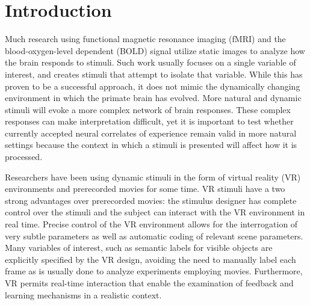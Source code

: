 \documentclass[review,1p,authoryear]{elsarticle}
\begin{document}
\section{Introduction}
Much research using functional magnetic resonance imaging (fMRI) and the blood-oxygen-level dependent (BOLD) signal utilize static images to analyze how the brain responds to stimuli.
Such work usually focuses on a single variable of interest, and creates stimuli that attempt to isolate that variable.
While this has proven to be a successful approach, it does not mimic the dynamically changing environment in which the primate brain has evolved.
More natural and dynamic stimuli will evoke a more complex network of brain responses.
These complex responses can make interpretation difficult, yet it is important to test whether currently accepted neural correlates of experience remain valid in more natural settings because the context in which a stimuli is presented will affect how it is processed.

Researchers have been using dynamic stimuli in the form of virtual reality (VR) environments \citep{Maguire1998,Calhoun2002,King2006,Mathiak2006,Spiers2007a,Hassabis2009} and prerecorded movies \citep{Hasson2004,Chadwick2010,Nishimoto2011} for some time.
VR stimuli have a two strong advantages over prerecorded movies: the stimulus designer has complete control over the stimuli and the subject can interact with the VR environment in real time.
Precise control of the VR environment allows for the interrogation of very subtle parameters as well as automatic coding of relevant scene parameters.
Many variables of interest, such as semantic labels for visible objects are explicitly specified by the VR design, avoiding the need to manually label each frame as is usually done to analyze experiments employing movies.
Furthermore, VR permits real-time interaction that enable the examination of feedback and learning mechanisms in a realistic context.
\end{document}
